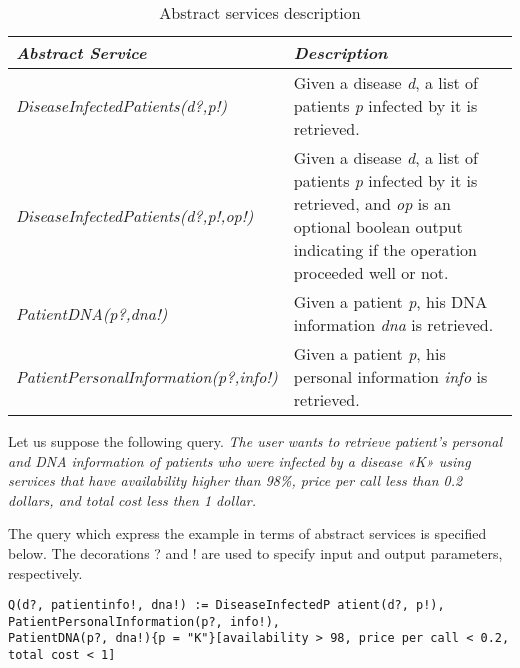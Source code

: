 \documentclass{sig-alternate}
\begin{document}
\begin{table}[h!]
\center
\begin{tabular}{|p{4cm}|p{4cm}|}
\hline 
\textbf{\textit{Abstract Service}} & \textbf{\textit{Description}} \\ 
\hline 
\textit{DiseaseInfectedPatients(d?,p!)} & Given a disease \textit{d}, a list of patients \textit{p} infected by it is retrieved. \\ 
\hline 
\textit{DiseaseInfectedPatients(d?,p!,op!)} & Given a disease \textit{d}, a list of patients \textit{p} infected by it is retrieved, and \textit{op} is an optional boolean output indicating if the operation proceeded well or not. \\ 
\hline 
\textit{PatientDNA(p?,dna!)} & Given a patient \textit{p}, his DNA information \textit{dna} is retrieved. \\ 
\hline 
\textit{PatientPersonalInformation(p?,info!)} & Given a patient \textit{p}, his personal information \textit{info} is retrieved. \\ 
\hline 
\end{tabular} \caption{Abstract services description}
\end{table}\label{example1}

\noindent Let us suppose the following query. 
\textit{The user wants to retrieve patient’s personal and DNA information of patients who were infected by a disease «K»	 using services that have availability higher than 98\%, price per call less than 0.2 dollars, and total cost less then 1 dollar.}

The query which express the example in terms of abstract services is specified below.
The decorations ? and ! are used to specify input and output parameters, respectively. 

\begin{tiny}
\begin{verbatim}
Q(d?, patientinfo!, dna!) := DiseaseInfectedP atient(d?, p!), PatientPersonalInformation(p?, info!),
PatientDNA(p?, dna!){p = "K"}[availability > 98, price per call < 0.2, total cost < 1]
\end{verbatim}
\end{tiny}


\end{document}
